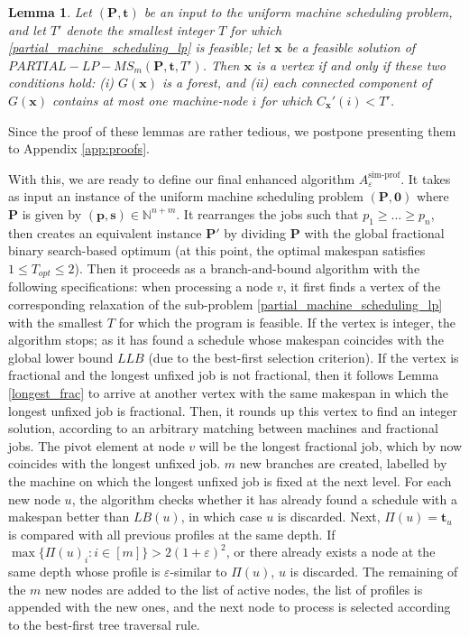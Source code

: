 \documentclass[moor,sglanonrev]{informs4}
\theoremstyle{plain}
\newtheorem{lmm}{Lemma}  %
\begin{document}
\begin{lmm}\label{vertex_char}
    Let $(\bm{P}, \bm{t})$ be an input to the uniform machine scheduling problem, and let $T'$ denote the smallest integer $T$ for which \eqref{partial_machine_scheduling_lp} is feasible; let $\bm{x}$ be a feasible solution of $PARTIAL-LP-MS_m (\bm{P}, \bm{t}, T')$. Then $\bm{x}$ is a vertex if and only if these two conditions hold: (i) $G(\bm{x})$ is a forest, and (ii) each connected component of $G(\bm{x})$ contains at most one machine-node $i$ for which $C_{\bm{x}}'(i)<T'$.
\end{lmm}

Since the proof of these lemmas are rather tedious, we postpone presenting them to Appendix \ref{app:proofs}.

\bigskip

With this, we are ready to define our final enhanced algorithm $A^{\text{sim-prof}}_{\varepsilon}$. It takes as input an instance of the uniform machine scheduling problem $(\bm{P}, \bm{0})$ where $\bm{P}$ is given by $(\bm{p}, \bm{s}) \in \mathbb{N}^{n+m}$. It rearranges the jobs such that $p_1 \ge \ldots \ge p_n$, then creates an equivalent instance $\bm{P}'$ by dividing $\bm{P}$ with the global fractional binary search-based optimum (at this point, the optimal makespan satisfies $1\le T_{opt}\le 2$). Then it proceeds as a branch-and-bound algorithm with the following specifications: when processing a node $v$, it first finds a vertex of the corresponding relaxation of the sub-problem \eqref{partial_machine_scheduling_lp} with the smallest $T$ for which the program is feasible. If the vertex is integer, the algorithm stops; as it has found a schedule whose makespan coincides with the global lower bound $LLB$ (due to the best-first selection criterion). If the vertex is fractional and the longest unfixed job is not fractional, then it follows Lemma \ref{longest_frac} to arrive at another vertex with the same makespan in which the longest unfixed job is fractional. Then, it rounds up this vertex to find an integer solution, according to an arbitrary matching between machines and fractional jobs. The pivot element at node $v$ will be the longest fractional job, which by now coincides with the longest unfixed job. $m$ new branches are created, labelled by the machine on which the longest unfixed job is fixed at the next level. For each new node $u$, the algorithm checks whether it has already found a schedule with a makespan better than $LB(u)$, in which case $u$ is discarded. Next, $\Pi(u) = \bm{t}_u$ is compared with all previous profiles at the same depth. If $\max\{\Pi(u)_i: i \in [m]\} > 2(1+\varepsilon)^2$, or there already exists a node at the same depth whose profile is $\varepsilon$-similar to $\Pi(u)$, $u$ is discarded. The remaining of the $m$ new nodes are added to the list of active nodes, the list of profiles is appended with the new ones, and the next node to process is selected according to the best-first tree traversal rule.
\end{document}
